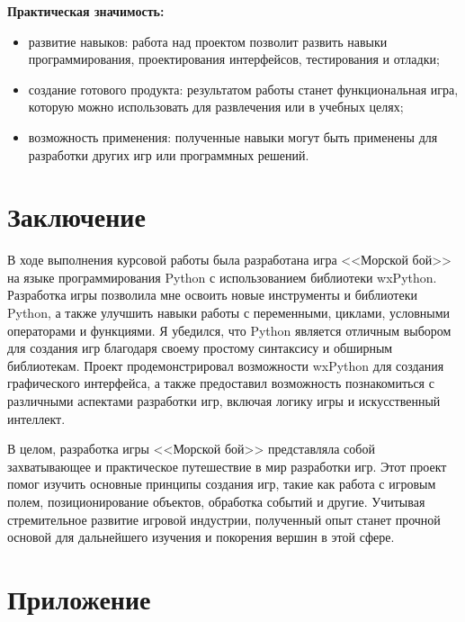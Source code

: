 \documentclass[14pt, oneside]{altsu-report}
\begin{document}
\textbf{Практическая значимость:}
\begin{itemize}
\item развитие навыков: работа над проектом позволит развить навыки программирования, проектирования интерфейсов, тестирования и отладки;
\item создание готового продукта: результатом работы станет функциональная игра, которую можно использовать для развлечения или в учебных целях;
\item возможность применения: полученные навыки могут быть применены для разработки других игр или программных решений.
\end{itemize}




\chapter*{Заключение}
В ходе выполнения курсовой работы была разработана игра <<Морской бой>> на языке программирования Python с использованием библиотеки wxPython. Разработка игры позволила мне освоить новые инструменты и библиотеки Python, а также улучшить навыки работы с переменными, циклами, условными операторами и функциями. Я убедился, что Python является отличным выбором для создания игр благодаря своему простому синтаксису и обширным библиотекам. Проект продемонстрировал возможности wxPython для создания графического интерфейса, а также предоставил возможность познакомиться с различными аспектами разработки игр, включая логику игры и искусственный интеллект.

В целом, разработка игры <<Морской бой>> представляла собой захватывающее и практическое путешествие в мир разработки игр. Этот проект помог изучить основные принципы создания игр, такие как работа с игровым полем, позиционирование объектов, обработка событий и другие. Учитывая стремительное развитие игровой индустрии, полученный опыт станет прочной основой для дальнейшего изучения и покорения вершин в этой сфере.
\newpage
{}
\printbibliography[title={Список использованной литературы}]
\nocite{*}

\appendix
\newpage
\chapter*{\raggedleft\label{appendix1}Приложение}
\end{document}
